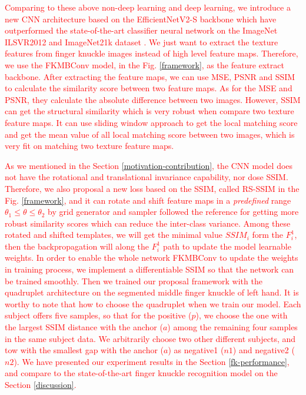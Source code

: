 \textcolor{red}{Comparing to these above non-deep learning and deep learning, we introduce a new CNN architecture based on the EfficientNetV2-S backbone \cite{tan2021efficientnetv2} which have outperformed the state-of-the-art classifier neural network on the ImageNet ILSVR2012 and ImageNet21k dataset \cite{russakovsky2015imagenet}. We just want to extract the texture features from finger knuckle images instead of high level feature maps. Therefore, we use the FKMBConv model, in the Fig. \ref{framework}, as the feature extract backbone. After extracting the feature maps, we can use MSE, PSNR and SSIM \cite{wang2004image} to calculate the similarity score between two feature maps. As for the MSE and PSNR, they calculate the absolute difference between two images. However, SSIM \cite{wang2004image} can get the structural similarity which is very robust when compare two texture feature maps. It can use sliding window approach to get the local matching score and get the mean value of all local matching score between two images, which is very fit on matching two texture feature maps.} 

\textcolor{red}{As we mentioned in the Section \ref{motivation-contribution}, the CNN model does not have the rotational and translational invariance capability, nor dose SSIM. Therefore, we also proposal a new loss based on the SSIM, called RS-SSIM in the Fig. \ref{framework}, and it can rotate and shift feature maps in a \textit{predefined} range $\theta_1 \leq \theta \leq \theta_2$ by grid generator and sampler followed the reference \cite{jaderberg2015spatial} for getting more robust similarity scores which can reduce the inter-class variance. Among these rotated and shifted templates, we will get the minimal value $SSIM_i$ form the $F_i^1$, then the backpropagation will along the $F_i^1$ path to update the model learnable weights. In order to enable the whole network FKMBConv to update the weights in training process, we implement a differentiable SSIM so that the network can be trained smoothly. Then we trained our proposal framework with the quadruplet architecture \cite{chen2017beyond} on the segmented middle finger knuckle of left hand. It is worthy to note that how to choose the quadruplet when we train our model. Each subject offers five samples, so that for the positive ($p$), we choose the one with the largest SSIM distance with the anchor ($a$) among the remaining four samples in the same subject data. We arbitrarily choose two other different subjects, and tow with the smallest gap with the anchor ($a$) as negative1 ($n1$) and negative2 ($n2$). We have presented our experiment results in the Section \ref{fk-performance}, and compare to the state-of-the-art finger knuckle recognition model on the Section \ref{discussion}.}


